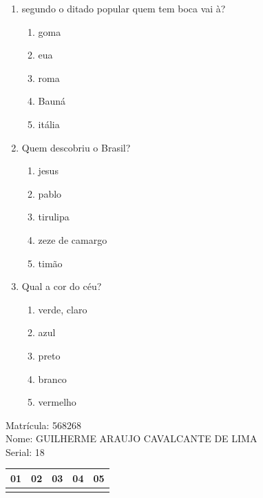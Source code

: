 \documentclass[10pt,a4paper,twocolumn]{report}
\begin{document}
 \begin{enumerate} 
    \item  segundo o ditado popular quem tem boca vai à?





    \begin{enumerate}
    \item  goma

\item  eua

\item  roma

\item  Bauná

\item  itália


    \end{enumerate} 
    \item  Quem descobriu o Brasil?





    \begin{enumerate}
    \item  jesus

\item  pablo

\item  tirulipa

\item  zeze de camargo

\item  timão


    \end{enumerate} 
    \item  Qual a cor do céu?





    \begin{enumerate}
    \item  verde, claro

\item  azul

\item  preto

\item  branco

\item  vermelho


    \end{enumerate}\end{enumerate} 
Matrícula: 568268\\ Nome: GUILHERME ARAUJO CAVALCANTE DE LIMA \\ Serial: 18\\
\begin{tabular}{|l|l|l|l|l|}\hline
01  &02  &03  &04  &05 \\ \hline 
 & & & & \\ \hline 
\end{tabular}
 \cleardoublepage 
\end{document}
